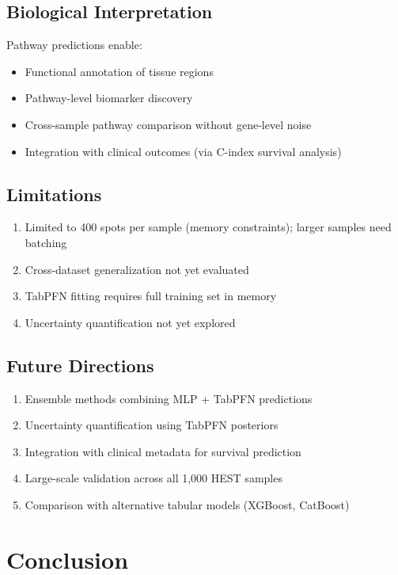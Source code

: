 \documentclass[conference]{IEEEtran}
\begin{document}
\subsection{Biological Interpretation}

Pathway predictions enable:
\begin{itemize}
\item Functional annotation of tissue regions
\item Pathway-level biomarker discovery
\item Cross-sample pathway comparison without gene-level noise
\item Integration with clinical outcomes (via C-index survival analysis)
\end{itemize}

\subsection{Limitations}

\begin{enumerate}
\item Limited to 400 spots per sample (memory constraints); larger samples need batching
\item Cross-dataset generalization not yet evaluated
\item TabPFN fitting requires full training set in memory
\item Uncertainty quantification not yet explored
\end{enumerate}

\subsection{Future Directions}

\begin{enumerate}
\item Ensemble methods combining MLP + TabPFN predictions
\item Uncertainty quantification using TabPFN posteriors
\item Integration with clinical metadata for survival prediction
\item Large-scale validation across all 1,000 HEST samples
\item Comparison with alternative tabular models (XGBoost, CatBoost)
\end{enumerate}

\section{Conclusion}
\end{document}
